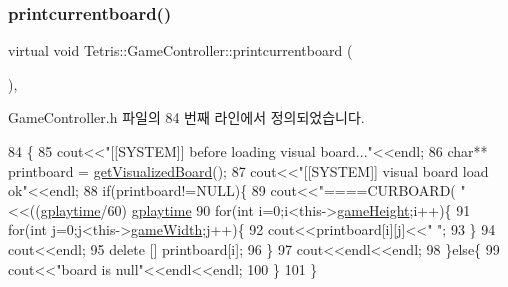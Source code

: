 \subsubsection{\texorpdfstring{printcurrentboard()}{printcurrentboard()}\hspace{0.1cm}{\footnotesize\ttfamily [1/2]}}
{\footnotesize\ttfamily virtual void Tetris\+::\+Game\+Controller\+::printcurrentboard (\begin{DoxyParamCaption}{ }\end{DoxyParamCaption})\hspace{0.3cm}{\ttfamily [inline]}, {\ttfamily [virtual]}}



Game\+Controller.\+h 파일의 84 번째 라인에서 정의되었습니다.


\begin{DoxyCode}
84                                         \{
85             cout<<\textcolor{stringliteral}{"[[SYSTEM]] before loading visual board..."}<<endl;
86             \textcolor{keywordtype}{char}** printboard = \hyperlink{class_tetris_1_1_game_controller_a78b39bdb39707e119d6e708bdb2aca17}{getVisualizedBoard}();
87             cout<<\textcolor{stringliteral}{"[[SYSTEM]] visual board load ok"}<<endl;
88             \textcolor{keywordflow}{if}(printboard!=NULL)\{
89                 cout<<\textcolor{stringliteral}{"====CURBOARD( "}<<((\hyperlink{class_tetris_1_1_game_controller_a562adcade20e362160535cd7248a2cce}{gplaytime}/60)%
      \hyperlink{class_tetris_1_1_game_controller_a562adcade20e362160535cd7248a2cce}{gplaytime}%
90                 \textcolor{keywordflow}{for}(\textcolor{keywordtype}{int} i=0;i<this->\hyperlink{class_tetris_1_1_game_controller_a8e3adc647ed382de0ff541417bea9b33}{gameHeight};i++)\{
91                     \textcolor{keywordflow}{for}(\textcolor{keywordtype}{int} j=0;j<this->\hyperlink{class_tetris_1_1_game_controller_a439f215918db4127fcb44cf9d501ed63}{gameWidth};j++)\{
92                         cout<<printboard[i][j]<<\textcolor{stringliteral}{" "};
93                     \}
94                     cout<<endl;
95                     \textcolor{keyword}{delete} [] printboard[i];
96                 \}
97                 cout<<endl<<endl;
98             \}\textcolor{keywordflow}{else}\{
99                 cout<<\textcolor{stringliteral}{"board is null"}<<endl<<endl;
100             \}
101         \}
\end{DoxyCode}
\mbox{\label{class_tetris_1_1_game_controller_a5553ac767c6065148b7c332f59251e76}} 
